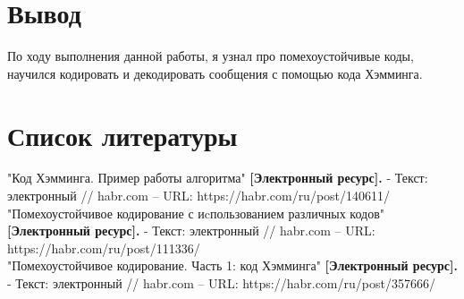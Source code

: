 \documentclass[12pt,onecolumn]{article}
\begin{document}
\section{Вывод}
По ходу выполнения данной работы, я узнал про помехоустойчивые коды, научился кодировать и декодировать сообщения с помощью кода Хэмминга.
\newpage
\section{Список литературы}
"Код Хэмминга. Пример работы алгоритма" \textbf{[Электронный ресурс].} - Текст: электронный // habr.com – URL: https://habr.com/ru/post/140611/ \\
"Помехоустойчивое кодирование с иcпользованием различных кодов" \textbf{[Электронный ресурс].} - Текст: электронный // habr.com – URL: https://habr.com/ru/post/111336/ \\
"Помехоустойчивое кодирование. Часть 1: код Хэмминга" \textbf{[Электронный ресурс].} - Текст: электронный // habr.com – URL: https://habr.com/ru/post/357666/
\end{document}
